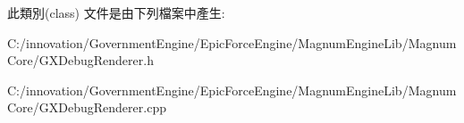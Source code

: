 此類別(class) 文件是由下列檔案中產生\+:\begin{DoxyCompactItemize}
\item 
C\+:/innovation/\+Government\+Engine/\+Epic\+Force\+Engine/\+Magnum\+Engine\+Lib/\+Magnum\+Core/G\+X\+Debug\+Renderer.\+h\item 
C\+:/innovation/\+Government\+Engine/\+Epic\+Force\+Engine/\+Magnum\+Engine\+Lib/\+Magnum\+Core/G\+X\+Debug\+Renderer.\+cpp\end{DoxyCompactItemize}
